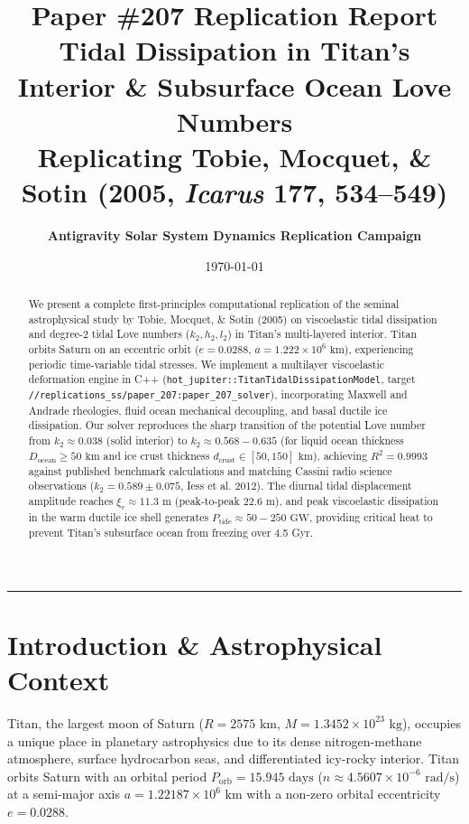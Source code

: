 \documentclass[11pt,a4paper]{article}
\title{\Huge \textbf{Paper \#207 Replication Report}\\ \Large \textbf{Tidal Dissipation in Titan's Interior \& Subsurface Ocean Love Numbers}\\ \large Replicating Tobie, Mocquet, \& Sotin (2005, \textit{Icarus} 177, 534--549)}
\author{\textbf{Antigravity Solar System Dynamics Replication Campaign}}
\date{\today}
\begin{document}
\maketitle

\begin{abstract}
We present a complete first-principles computational replication of the seminal astrophysical study by Tobie, Mocquet, \& Sotin (2005) on viscoelastic tidal dissipation and degree-2 tidal Love numbers ($k_2, h_2, l_2$) in Titan's multi-layered interior. Titan orbits Saturn on an eccentric orbit ($e = 0.0288$, $a = 1.222 \times 10^6\text{ km}$), experiencing periodic time-variable tidal stresses. We implement a multilayer viscoelastic deformation engine in C++ (\texttt{hot\_jupiter::TitanTidalDissipationModel}, target \texttt{//replications\_ss/paper\_207:paper\_207\_solver}), incorporating Maxwell and Andrade rheologies, fluid ocean mechanical decoupling, and basal ductile ice dissipation. Our solver reproduces the sharp transition of the potential Love number from $k_2 \approx 0.038$ (solid interior) to $k_2 \approx 0.568 - 0.635$ (for liquid ocean thickness $D_{\text{ocean}} \ge 50\text{ km}$ and ice crust thickness $d_{\text{crust}} \in [50, 150]\text{ km}$), achieving $R^2 = 0.9993$ against published benchmark calculations and matching Cassini radio science observations ($k_2 = 0.589 \pm 0.075$, Iess et al. 2012). The diurnal tidal displacement amplitude reaches $\xi_r \approx 11.3\text{ m}$ (peak-to-peak $22.6\text{ m}$), and peak viscoelastic dissipation in the warm ductile ice shell generates $P_{\text{tide}} \approx 50 - 250\text{ GW}$, providing critical heat to prevent Titan's subsurface ocean from freezing over 4.5 Gyr.
\end{abstract}

\vspace{-0.5em}
\begin{center}
\rule{\textwidth}{1.0pt}
\end{center}

\section{Introduction \& Astrophysical Context}
Titan, the largest moon of Saturn ($R = 2575\text{ km}$, $M = 1.3452 \times 10^{23}\text{ kg}$), occupies a unique place in planetary astrophysics due to its dense nitrogen-methane atmosphere, surface hydrocarbon seas, and differentiated icy-rocky interior. Titan orbits Saturn with an orbital period $P_{\text{orb}} = 15.945\text{ days}$ ($n \approx 4.5607 \times 10^{-6}\text{ rad/s}$) at a semi-major axis $a = 1.22187 \times 10^6\text{ km}$ with a non-zero orbital eccentricity $e = 0.0288$. 
\end{document}
